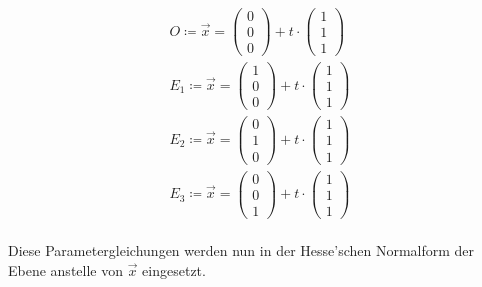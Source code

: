 \begin{gather}
O\coloneqq \vec{x}=\begin{pmatrix}
0\\0\\0
\end{pmatrix} +t\cdot\begin{pmatrix}
1\\1\\1
\end{pmatrix}\\
E_1\coloneqq \vec{x}=\begin{pmatrix}
1\\0\\0
\end{pmatrix} +t\cdot\begin{pmatrix}
1\\1\\1
\end{pmatrix}\\
E_2\coloneqq \vec{x}=\begin{pmatrix}
0\\1\\0
\end{pmatrix} +t\cdot\begin{pmatrix}
1\\1\\1
\end{pmatrix}\\
E_3\coloneqq \vec{x}=\begin{pmatrix}
0\\0\\1
\end{pmatrix} +t\cdot\begin{pmatrix}
1\\1\\1
\end{pmatrix}
\end{gather}\\

Diese Parametergleichungen werden nun in der Hesse'schen Normalform der Ebene anstelle von \ensuremath{\vec{x}} eingesetzt.

